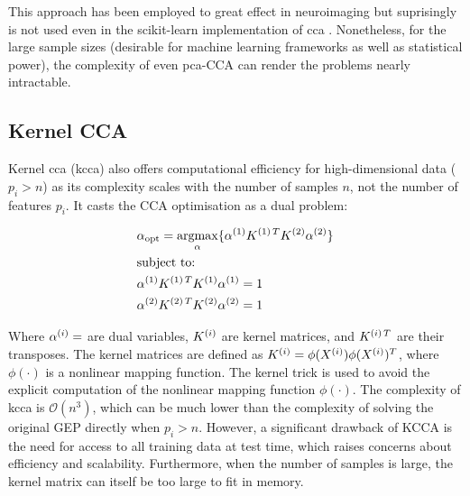 This approach has been employed to great effect in neuroimaging but suprisingly is not used even in the scikit-learn implementation of \acrshort{cca} \citep{pedregosa2011scikit}.
Nonetheless, for the large sample sizes (desirable for machine learning frameworks as well as statistical power), the complexity of even \acrshort{pca}-CCA can render the problems nearly intractable.

\subsection{Kernel CCA}

Kernel \acrshort{cca} (\acrshort{kcca}) also offers computational efficiency for high-dimensional data (\(p_i>n\)) as its complexity scales with the number of samples \(n\), not the number of features \(p_i\)\citep{akaho2006kernel}.
It casts the CCA optimisation as a dual problem:

\begin{align}
    & \alpha_{\text{opt}}=\underset{\alpha}{\mathrm{argmax}}\{ \alpha^{(1)}K^{(1)\,T}K^{(2)}\alpha^{(2)}  \} \\
    & \text{subject to:} \notag                                                                                            \\
    & \alpha^{(1)}K^{(1)\,T}K^{(1)}\alpha^{(1)}=1 \notag                                                                  \\
    & \alpha^{(2)}K^{(2)\,T}K^{(2)}\alpha^{(2)}=1 \notag
\end{align}

Where \(\alpha^{(i)}=\) are dual variables, \(K^{(i)}\) are kernel matrices, and \(K^{(i)\,T}\) are their transposes.
The kernel matrices are defined as \(K^{(i)}=\phi(X^{(i)})\phi(X^{(i)})^T\), where \(\phi(\cdot)\) is a nonlinear mapping function.
The kernel trick is used to avoid the explicit computation of the nonlinear mapping function \(\phi(\cdot)\).
The complexity of \acrshort{kcca} is \(\mathcal{O}(n^3)\), which can be much lower than the complexity of solving the original GEP directly when \(p_i>n\).
However, a significant drawback of KCCA is the need for access to all training data at test time, which raises concerns about efficiency and scalability.
Furthermore, when the number of samples is large, the kernel matrix can itself be too large to fit in memory.

